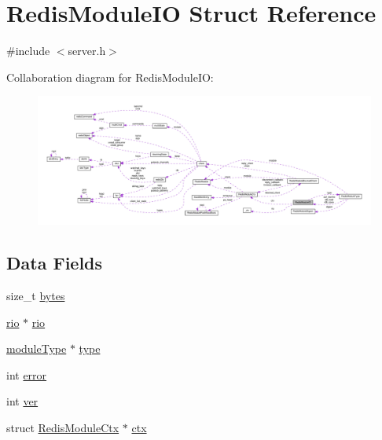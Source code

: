 \hypertarget{struct_redis_module_i_o}{}\section{Redis\+Module\+IO Struct Reference}
\label{struct_redis_module_i_o}


{\ttfamily \#include $<$server.\+h$>$}



Collaboration diagram for Redis\+Module\+IO\+:
\nopagebreak
\begin{figure}[H]
\begin{center}
\leavevmode
\includegraphics[width=350pt]{struct_redis_module_i_o__coll__graph}
\end{center}
\end{figure}
\subsection*{Data Fields}
\begin{DoxyCompactItemize}
\item 
size\+\_\+t \hyperlink{struct_redis_module_i_o_ad85da8142cdb13f7b5eaf889a527f3dd}{bytes}
\item 
\hyperlink{rio_8h_a048ce06d2f559006ef67f885ceb2c1ca}{rio} $\ast$ \hyperlink{struct_redis_module_i_o_a9f62ec81cd12b2b2e4faebe457b15440}{rio}
\item 
\hyperlink{server_8h_a3e81a33920e783a6b35dedfd7bdb6a2c}{module\+Type} $\ast$ \hyperlink{struct_redis_module_i_o_a05eee39e39e34439ea77af35b597b1ae}{type}
\item 
int \hyperlink{struct_redis_module_i_o_a11614f44ef4d939bdd984953346a7572}{error}
\item 
int \hyperlink{struct_redis_module_i_o_a88ca8dd6d8b1535e6ba06c4d988c525b}{ver}
\item 
struct \hyperlink{struct_redis_module_ctx}{Redis\+Module\+Ctx} $\ast$ \hyperlink{struct_redis_module_i_o_a42b495e9ea53fa67943ff943d4ed10ff}{ctx}
\end{DoxyCompactItemize}



